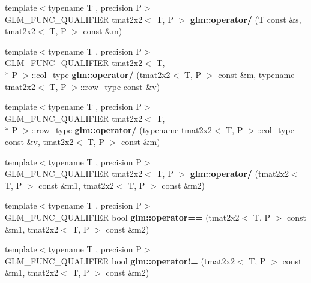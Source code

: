 \begin{DoxyCompactItemize}
\item 
\hypertarget{namespaceglm_a17739714873762c328b1379217868bd2}{{\footnotesize template$<$typename T , precision P$>$ }\\G\-L\-M\-\_\-\-F\-U\-N\-C\-\_\-\-Q\-U\-A\-L\-I\-F\-I\-E\-R tmat2x2$<$ T, P $>$ {\bfseries glm\-::operator/} (T const \&s, tmat2x2$<$ T, P $>$ const \&m)}\label{namespaceglm_a17739714873762c328b1379217868bd2}

\item 
\hypertarget{namespaceglm_a41ca2c01300738deb25fbc9a9e630cd4}{{\footnotesize template$<$typename T , precision P$>$ }\\G\-L\-M\-\_\-\-F\-U\-N\-C\-\_\-\-Q\-U\-A\-L\-I\-F\-I\-E\-R tmat2x2$<$ T, \\*
P $>$\-::col\-\_\-type {\bfseries glm\-::operator/} (tmat2x2$<$ T, P $>$ const \&m, typename tmat2x2$<$ T, P $>$\-::row\-\_\-type const \&v)}\label{namespaceglm_a41ca2c01300738deb25fbc9a9e630cd4}

\item 
\hypertarget{namespaceglm_a48dab5d24cd57eed83bce16c3e44a206}{{\footnotesize template$<$typename T , precision P$>$ }\\G\-L\-M\-\_\-\-F\-U\-N\-C\-\_\-\-Q\-U\-A\-L\-I\-F\-I\-E\-R tmat2x2$<$ T, \\*
P $>$\-::row\-\_\-type {\bfseries glm\-::operator/} (typename tmat2x2$<$ T, P $>$\-::col\-\_\-type const \&v, tmat2x2$<$ T, P $>$ const \&m)}\label{namespaceglm_a48dab5d24cd57eed83bce16c3e44a206}

\item 
\hypertarget{namespaceglm_a94743dfdf0d7c17b17f87e7253583853}{{\footnotesize template$<$typename T , precision P$>$ }\\G\-L\-M\-\_\-\-F\-U\-N\-C\-\_\-\-Q\-U\-A\-L\-I\-F\-I\-E\-R tmat2x2$<$ T, P $>$ {\bfseries glm\-::operator/} (tmat2x2$<$ T, P $>$ const \&m1, tmat2x2$<$ T, P $>$ const \&m2)}\label{namespaceglm_a94743dfdf0d7c17b17f87e7253583853}

\item 
\hypertarget{namespaceglm_adedfd20e640bc56d8a720e541e958ca2}{{\footnotesize template$<$typename T , precision P$>$ }\\G\-L\-M\-\_\-\-F\-U\-N\-C\-\_\-\-Q\-U\-A\-L\-I\-F\-I\-E\-R bool {\bfseries glm\-::operator==} (tmat2x2$<$ T, P $>$ const \&m1, tmat2x2$<$ T, P $>$ const \&m2)}\label{namespaceglm_adedfd20e640bc56d8a720e541e958ca2}

\item 
\hypertarget{namespaceglm_aa7932b253b4552536b3e7e9b6853a937}{{\footnotesize template$<$typename T , precision P$>$ }\\G\-L\-M\-\_\-\-F\-U\-N\-C\-\_\-\-Q\-U\-A\-L\-I\-F\-I\-E\-R bool {\bfseries glm\-::operator!=} (tmat2x2$<$ T, P $>$ const \&m1, tmat2x2$<$ T, P $>$ const \&m2)}\label{namespaceglm_aa7932b253b4552536b3e7e9b6853a937}

\end{DoxyCompactItemize}


